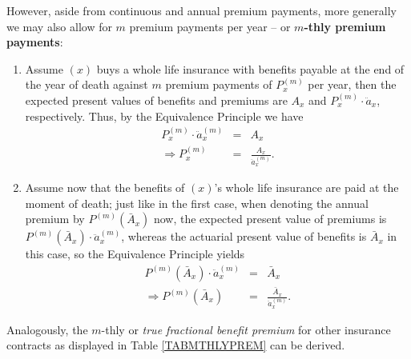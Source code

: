 \documentclass[11pt,fleqn,oneside]{book}
\begin{document}
However, aside from continuous and annual premium payments, more generally we may also allow for $m$ premium payments per year -- or \textbf{$m$-thly premium payments}:
\begin{enumerate}
\item Assume $(x)$ buys a whole life insurance with benefits payable at the end of the year of death against $m$ premium payments of $P_x^{(m)}$ per year, then the expected present values of benefits and premiums  are $A_x$ and $P_x^{(m)}\cdot \ddot{a}_x$, respectively. Thus, by the Equivalence Principle we have
\begin{eqnarray*}
P_x^{(m)}\cdot \ddot{a}_x^{(m)} &=& A_x \\
\Rightarrow P_x^{(m)} &=& \frac{A_x}{\ddot{a}_x^{(m)}}. 
\end{eqnarray*}
\item Assume now that the benefits of $(x)$'s whole life insurance are paid at the moment of death; just like in the first case, when denoting the annual premium by $P^{(m)}\left(\bar{A}_x\right)$ now, the expected present value of premiums is $P^{(m)}\left(\bar{A}_x\right)\cdot \ddot{a}_x^{(m)}$, whereas the actuarial present value of benefits is $\bar{A}_x$ in this case, so the Equivalence Principle yields
\begin{eqnarray*}
P^{(m)}\left(\bar{A}_x\right)\cdot \ddot{a}_x^{(m)} &=& \bar{A}_x \\
\Rightarrow P^{(m)}\left(\bar{A}_x\right) &=& \frac{\bar{A}_x}{\ddot{a}_x^{(m)}}.
\end{eqnarray*}
\end{enumerate}
Analogously, the $m$-thly or \textit{true fractional benefit premium} for other insurance contracts as displayed in Table \ref{TABMTHLYPREM} can be derived.
\end{document}
